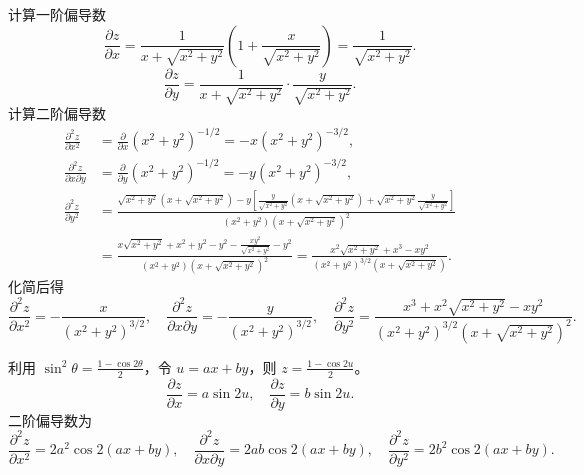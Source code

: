 \begin{solution}
    计算一阶偏导数
    \begin{equation}
        \frac{\partial z}{\partial x} = \frac{1}{x + \sqrt{x^{2}+y^{2}}} \left( 1 + \frac{x}{\sqrt{x^{2}+y^{2}}} \right) = \frac{1}{\sqrt{x^{2}+y^{2}}}.
    \end{equation}
    \begin{equation}
        \frac{\partial z}{\partial y} = \frac{1}{x + \sqrt{x^{2}+y^{2}}} \cdot \frac{y}{\sqrt{x^{2}+y^{2}}}.
    \end{equation}
    计算二阶偏导数
    \begin{equation}
        \begin{aligned}
            \frac{\partial^{2} z}{\partial x^{2}}        & = \frac{\partial}{\partial x} (x^{2}+y^{2})^{-1/2} = -x(x^{2}+y^{2})^{-3/2},                                                                                                                                                            \\
            \frac{\partial^{2} z}{\partial x \partial y} & = \frac{\partial}{\partial y} (x^{2}+y^{2})^{-1/2} = -y(x^{2}+y^{2})^{-3/2},                                                                                                                                                            \\
            \frac{\partial^{2} z}{\partial y^{2}}        & = \frac{\sqrt{x^{2}+y^{2}}(x+\sqrt{x^{2}+y^{2}}) - y \left[ \frac{y}{\sqrt{x^{2}+y^{2}}}(x+\sqrt{x^{2}+y^{2}}) + \sqrt{x^{2}+y^{2}} \frac{y}{\sqrt{x^{2}+y^{2}}} \right]}{(x^{2}+y^{2})(x+\sqrt{x^{2}+y^{2}})^{2}}                      \\
                                                         & = \frac{x\sqrt{x^{2}+y^{2}} + x^{2} + y^{2} - y^{2} - \frac{xy^{2}}{\sqrt{x^{2}+y^{2}}} - y^{2}}{(x^{2}+y^{2})(x+\sqrt{x^{2}+y^{2}})^{2}} = \frac{x^{2}\sqrt{x^{2}+y^{2}} + x^{3} - xy^{2}}{(x^{2}+y^{2})^{3/2}(x+\sqrt{x^{2}+y^{2}})}.
        \end{aligned}
    \end{equation}
    化简后得
    \begin{equation}
        \boxed{\frac{\partial^{2} z}{\partial x^{2}} = -\frac{x}{(x^{2}+y^{2})^{3/2}}, \quad \frac{\partial^{2} z}{\partial x \partial y} = -\frac{y}{(x^{2}+y^{2})^{3/2}}, \quad \frac{\partial^{2} z}{\partial y^{2}} = \frac{x^{3} + x^{2}\sqrt{x^{2}+y^{2}} - xy^{2}}{(x^{2}+y^{2})^{3/2}(x+\sqrt{x^{2}+y^{2}})^{2}}.}
    \end{equation}

    利用 $\sin^{2} \theta = \frac{1 - \cos 2\theta}{2}$，令 $u = ax+by$，则 $z = \frac{1 - \cos 2u}{2}$。
    \begin{equation}
        \frac{\partial z}{\partial x} = a \sin 2u, \quad \frac{\partial z}{\partial y} = b \sin 2u.
    \end{equation}
    二阶偏导数为
    \begin{equation}
        \boxed{\frac{\partial^{2} z}{\partial x^{2}} = 2a^{2} \cos 2(ax+by), \quad \frac{\partial^{2} z}{\partial x \partial y} = 2ab \cos 2(ax+by), \quad \frac{\partial^{2} z}{\partial y^{2}} = 2b^{2} \cos 2(ax+by).}
    \end{equation}


\end{solution}
